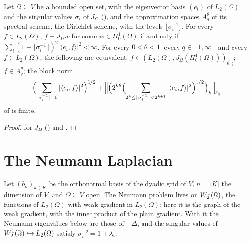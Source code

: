\begin{corollary}
\label{cor:dirichlet-interpolation}
\leanok
{}
Let $\Omega \subseteq V$ be a bounded open set, with the eigenvector basis $(e_i)$ of
$L_2(\Omega)$ and the singular values $\sigma_i$ of $J_\Omega$ (),
and the approximation spaces $A^\theta_q$ of its spectral scheme, the Dirichlet scheme, with the
levels $\lfloor \sigma_i^{-1} \rfloor$.
For every $f \in L_2(\Omega)$, $f = J_\Omega w$ for some $w \in H^1_0(\Omega)$ if and only if
$\sum_i (1 + \lfloor \sigma_i^{-1} \rfloor)^2 |\langle e_i, f \rangle|^2 < \infty$. For every
$0 < \theta < 1$, every $q \in [1, \infty]$ and every $f \in L_2(\Omega)$, the following are
equivalent:
$f \in (L_2(\Omega), J_\Omega(H^1_0(\Omega)))_{\theta, q}$; $f \in A^\theta_q$; the block norm
\[
  \Bigl(\sum_{\lfloor \sigma_i^{-1} \rfloor = 0} |\langle e_i, f \rangle|^2\Bigr)^{1/2}
  + \Bigl\| \Bigl(2^{k\theta} \Bigl(\sum_{2^k \leq \lfloor \sigma_i^{-1} \rfloor < 2^{k+1}}
    |\langle e_i, f \rangle|^2\Bigr)^{1/2}\Bigr)_k \Bigr\|_{\ell_q}
\]
of  is finite.
\end{corollary}

\begin{proof}
\leanok
{} for $J_\Omega$ () and
.
\end{proof}

\section{The Neumann Laplacian}
\label{sec:neumann-eigenbasis}

Let $(b_k)_{k \in K}$ be the orthonormal basis of the dyadic grid of $V$, $n = |K|$ the dimension
of $V$, and $\Omega \subseteq V$ open. The Neumann problem lives on $W^{1}_{2}(\Omega)$, the
functions of $L_2(\Omega)$ with weak gradient in $L_2(\Omega)$; here it is the graph of the weak
gradient, with the inner product of the plain gradient. With it the Neumann eigenvalues below are
those of $-\Delta$, and the singular values of $W^{1}_{2}(\Omega) \hookrightarrow L_2(\Omega)$
satisfy $\sigma_i^{-2} = 1 + \lambda_i$.

